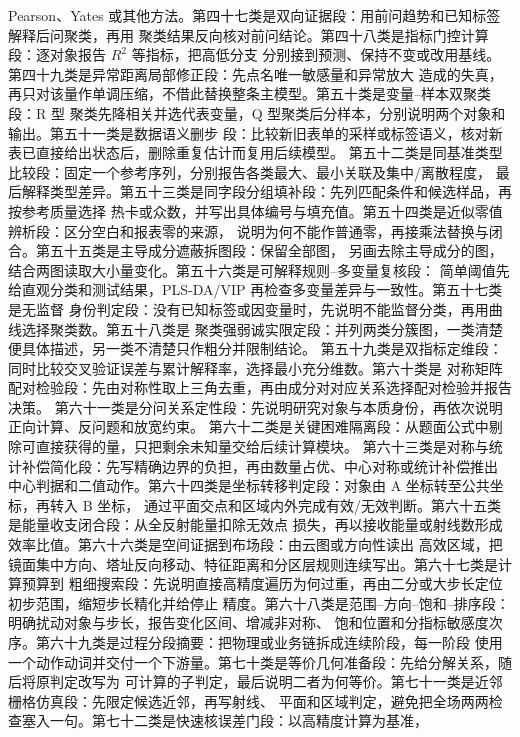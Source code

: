\documentclass[UTF8,a4paper,12pt]{ctexart}
\begin{document}
Pearson、Yates 或其他方法。第四十七类是双向证据段：用前问趋势和已知标签解释后问聚类，再用
聚类结果反向核对前问结论。第四十八类是指标门控计算段：逐对象报告 $R^2$ 等指标，把高低分支
分别接到预测、保持不变或改用基线。第四十九类是异常距离局部修正段：先点名唯一敏感量和异常放大
造成的失真，再只对该量作单调压缩，不借此替换整条主模型。第五十类是变量--样本双聚类段：R 型
聚类先降相关并选代表变量，Q 型聚类后分样本，分别说明两个对象和输出。第五十一类是数据语义删步
段：比较新旧表单的采样或标签语义，核对新表已直接给出状态后，删除重复估计而复用后续模型。
第五十二类是同基准类型比较段：固定一个参考序列，分别报告各类最大、最小关联及集中/离散程度，
最后解释类型差异。第五十三类是同字段分组填补段：先列匹配条件和候选样品，再按参考质量选择
热卡或众数，并写出具体编号与填充值。第五十四类是近似零值辨析段：区分空白和报表零的来源，
说明为何不能作普通零，再接乘法替换与闭合。第五十五类是主导成分遮蔽拆图段：保留全部图，
另画去除主导成分的图，结合两图读取大小量变化。第五十六类是可解释规则--多变量复核段：
简单阈值先给直观分类和测试结果，PLS-DA/VIP 再检查多变量差异与一致性。第五十七类是无监督
身份判定段：没有已知标签或因变量时，先说明不能监督分类，再用曲线选择聚类数。第五十八类是
聚类强弱诚实限定段：并列两类分簇图，一类清楚便具体描述，另一类不清楚只作粗分并限制结论。
第五十九类是双指标定维段：同时比较交叉验证误差与累计解释率，选择最小充分维数。第六十类是
对称矩阵配对检验段：先由对称性取上三角去重，再由成分对对应关系选择配对检验并报告决策。
第六十一类是分问关系定性段：先说明研究对象与本质身份，再依次说明正向计算、反问题和放宽约束。
第六十二类是关键困难隔离段：从题面公式中剔除可直接获得的量，只把剩余未知量交给后续计算模块。
第六十三类是对称与统计补偿简化段：先写精确边界的负担，再由数量占优、中心对称或统计补偿推出
中心判据和二值动作。第六十四类是坐标转移判定段：对象由 A 坐标转至公共坐标，再转入 B 坐标，
通过平面交点和区域内外完成有效/无效判断。第六十五类是能量收支闭合段：从全反射能量扣除无效点
损失，再以接收能量或射线数形成效率比值。第六十六类是空间证据到布场段：由云图或方向性读出
高效区域，把镜面集中方向、塔址反向移动、特征距离和分区层规则连续写出。第六十七类是计算预算到
粗细搜索段：先说明直接高精度遍历为何过重，再由二分或大步长定位初步范围，缩短步长精化并给停止
精度。第六十八类是范围--方向--饱和--排序段：明确扰动对象与步长，报告变化区间、增减非对称、
饱和位置和分指标敏感度次序。第六十九类是过程分段摘要：把物理或业务链拆成连续阶段，每一阶段
使用一个动作动词并交付一个下游量。第七十类是等价几何准备段：先给分解关系，随后将原判定改写为
可计算的子判定，最后说明二者为何等价。第七十一类是近邻栅格仿真段：先限定候选近邻，再写射线、
平面和区域判定，避免把全场两两检查塞入一句。第七十二类是快速核误差门段：以高精度计算为基准，
\end{document}
